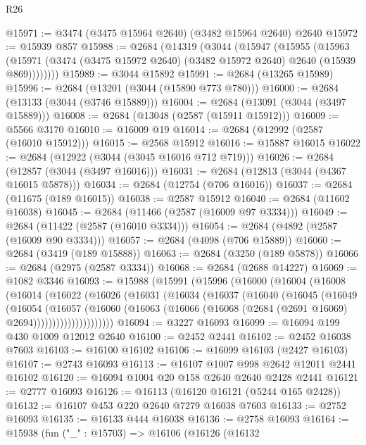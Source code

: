 \begin{lexlean}{R26}
\begin{coremodule}
@15971 := @3474 (@3475 @15964 @2640) (@3482 @15964 @2640) @2640
@15972 := @15939 @857
@15988 := @2684
    (@14319
      (@3044
        (@15947
          (@15955
            (@15963
              (@15971 (@3474 (@3475 @15972 @2640) (@3482 @15972 @2640) @2640 (@15939 @869))))))))
@15989 := @3044 @15892
@15991 := @2684 (@13265 @15989)
@15996 := @2684 (@13201 (@3044 (@15890 @773 @780)))
@16000 := @2684 (@13133 (@3044 (@3746 @15889)))
@16004 := @2684 (@13091 (@3044 (@3497 @15889)))
@16008 := @2684 (@13048 (@2587 (@15911 @15912)))
@16009 := @5566 @3170
@16010 := @16009 @19
@16014 := @2684 (@12992 (@2587 (@16010 @15912)))
@16015 := @2568 @15912
@16016 := @15887 @16015
@16022 := @2684 (@12922 (@3044 (@3045 @16016 @712 @719)))
@16026 := @2684 (@12857 (@3044 (@3497 @16016)))
@16031 := @2684 (@12813 (@3044 (@4367 @16015 @5878)))
@16034 := @2684 (@12754 (@706 @16016))
@16037 := @2684 (@11675 (@189 @16015))
@16038 := @2587 @15912
@16040 := @2684 (@11602 @16038)
@16045 := @2684 (@11466 (@2587 (@16009 @97 @3334)))
@16049 := @2684 (@11422 (@2587 (@16010 @3334)))
@16054 := @2684 (@4892 (@2587 (@16009 @90 @3334)))
@16057 := @2684 (@4098 (@706 @15889))
@16060 := @2684 (@3419 (@189 @15888))
@16063 := @2684 (@3250 (@189 @5878))
@16066 := @2684 (@2975 (@2587 @3334))
@16068 := @2684 (@2688 @14227)
@16069 := @1082 @3346
@16093 := @15988
    (@15991
      (@15996
        (@16000
          (@16004
            (@16008
              (@16014
                (@16022
                  (@16026
                    (@16031
                      (@16034
                        (@16037
                          (@16040
                            (@16045
                              (@16049
                                (@16054
                                  (@16057
                                    (@16060
                                      (@16063
                                        (@16066
                                          (@16068 (@2684 (@2691 @16069) @2694)))))))))))))))))))))
@16094 := @3227 @16093
@16099 := @16094 @199 @430 @1009 @12012 @2640
@16100 := @2452 @2441
@16102 := @2452 @16038 @7603
@16103 := @16100 @16102
@16106 := @16099 @16103 (@2427 @16103)
@16107 := @2743 @16093
@16113 := @16107 @1007 @998 @2642 @12011 @2441 @16102
@16120 := @16094 @1004 @20 @158 @2640 @2640 @2428 @2441
@16121 := @2777 @16093
@16126 := @16113 (@16120 @16121 (@5244 @165 @2428))
@16132 := @16107 @453 @220 @2640 @7279 @16038 @7603
@16133 := @2752 @16093
@16135 := @16133 @444 @16038
@16136 := @2758 @16093
@16164 := @15938
    (fun ("_" : @15703) =>
    @16106
      (@16126
        (@16132

\end{coremodule}
\end{lexlean}
